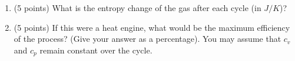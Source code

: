 \documentclass[fleqn]{article}
\begin{document}
\begin{enumerate}
\begin{enumerate}
        \textcolor{hwColor}{
          \\
          $
            \begin{cases}
                W=-P ~ \Delta V
                \\
                \\
                Q=\Delta U-W
              \end{cases}
            $
            \\
            \\
            The work done for a gas is positive when volume is decreasing and it is negative when volume is increasing.
            \\
            \\
            $
              \begin{cases}
                W_{AB}=0
                \\
                \\
                W_{BC}=-P_2 \bigg( V_2-V_1 \bigg)
                \\
                \\
                W_{CD}=0
                \\
                \\
                W_{DA}=-P_1 \bigg( V_1-V_2 \bigg)
              \end{cases}
              \\
              \\
              \\
              W=W_{AB}+W_{BC}+W_{CD}+W_{DA}
              =0
              -P_2 \bigg( V_2-V_1 \bigg)
              +0
              -P_1 \bigg( V_1-V_2 \bigg)
              \\
              \\
              \\
              W=-(4 \times 10^5 ~ Nm^{-2}) (3-1 ~ m^3)-(1 \times 10^5 ~ Nm^{-2})(1-3 ~ m^3)
              \\
              \\
              \\
              \therefore ~~~ W=-6 \times 10^5 ~ J
              \\
            $
        }

      \item (5 points) What is the entropy change of the gas after each cycle (in $J/K$)?
  
      \item (5 points) If this were a heat engine, what would be the maximum efficiency of the process?
      (Give your answer as a percentage). You may assume that $c_v$ and $c_p$ remain constant over
      the cycle.


\end{enumerate}
\end{enumerate}
\end{document}
